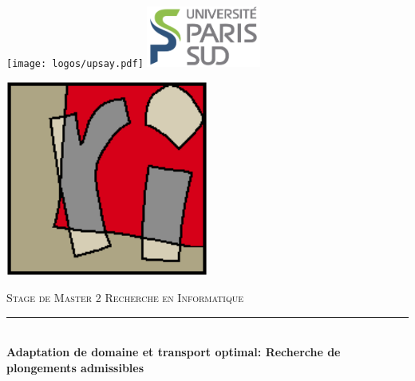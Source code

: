 \documentclass[oneside]{memoir}
\newcommand{\HRule}{\rule{\linewidth}{0.5mm}}
\begin{document}
\begin{titlingpage}
 
\begin{center}
 
% 
\texttt{[image: logos/upsay.pdf]} \hfill %
\includegraphics[height=2cm]{logos/ups.png} %
\\[1.5cm]


\begin{minipage}{0.2\textwidth}
\end{minipage}
\begin{minipage}{0.2\textwidth}
  \begin{flushright}
    \includegraphics[width=0.5\textwidth]{logos/lri.png}
  \end{flushright}
\end{minipage}


\vspace{2cm} 
\textsc{\Large Stage de Master 2 Recherche en Informatique}\\[0.5cm]
 
 
\HRule \\[0.4cm]
{ \huge \bfseries Adaptation de domaine et transport optimal: Recherche de plongements admissibles}\\[0.4cm]
 

\end{center}
\end{titlingpage}
\end{document}
